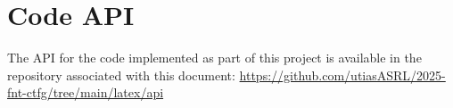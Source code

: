 
\chapter{Code API}

The \ac{API} for the code implemented as part of this project is available in the repository associated with this document: \url{https://github.com/utiasASRL/2025-fnt-ctfg/tree/main/latex/api}